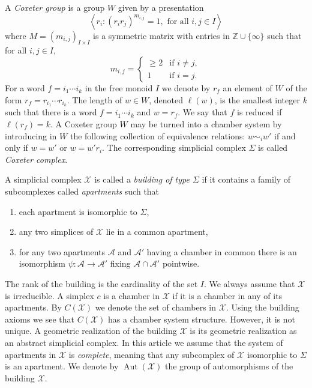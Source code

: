 \documentclass[11pt]{amsart}
\newcommand{\ZZ}{\mathbb{Z}}
\newcommand{\scrX}{\mathscr{X}}
\newcommand{\scrA}{\mathscr{A}}
\newcommand{\Aut}{\operatorname{Aut}}
\theoremstyle{plain}
\theoremstyle{definition}
\numberwithin{equation}{section}
\begin{document}
A \emph{Coxeter group} is a group $W$ given by a presentation
\[
	\left\langle
	r_i : (r_i r_j)^{m_{i, j}} = 1, \text{ for all } i, j \in I
	\right\rangle
\]
where $M = (m_{i,j})_{I \times I}$ is a symmetric matrix with entries in $\ZZ \cup \{\infty\}$ such that for all
$i, j \in I$,
\[
	m_{i,j}=
	\begin{cases}
	\geqslant2 & \text{if }i\neq j,\\
	1 & \text{if }i=j.
	\end{cases}
\]
For a word $f=i_1 \cdots i_k$ in the free monoid $I$ we denote by $r_f$ an element of $W$ of the form
$r_f= r_{i_1} \cdots r_{i_k}$. The length of $w \in W$, denoted $\ell(w)$, is the smallest integer $k$ such that there
is a word $f=i_1 \cdots i_k$ and $w=r_f$. We say that $f$ is reduced if $\ell(r_f) = k$. A Coxeter group $W$ may be turned
into a chamber system by introducing in $W$ the following collection of equivalence relations:
$w \sim_i w'$ if and only if $w = w'$ or $w = w' r_i$. The corresponding simplicial complex $\Sigma$ is called 
\emph{Coxeter complex}. 
	
A simplicial complex $\scrX$ is called a \emph{building of type $\Sigma$} if it contains a family of subcomplexes called
\emph{apartments} such that
\begin{enumerate}[start=0, label=(B\roman*), ref=B\roman*]
	\item[(Bi)]\label{en:3:1}
	each apartment is isomorphic to $\Sigma$,
	\item[(Bii)]\label{en:3:2}
	any two simplices of $\scrX$ lie in a common apartment,
	\item[(Biii)]\label{en:3:3}
	for any two apartments $\scrA$ and $\scrA'$ having a chamber in common there is an 
	isomorphism $\psi: \scrA \rightarrow \scrA'$ fixing $\scrA \cap \scrA'$ pointwise.
\end{enumerate}
The rank of the building is the cardinality of the set $I$. We always assume that $\scrX$ is irreducible.
A simplex $c$ is a chamber in $\scrX$ if it is a chamber in any of its apartments. By $C(\scrX)$ we denote the set of chambers 
in $\scrX$. Using the building axioms we see that $C(\scrX)$ has a chamber system structure. However, it is not unique. 
A geometric realization of the building	$\scrX$ is its geometric realization as an abstract simplicial complex. In this article 
we assume that the system of apartments in $\scrX$ is \emph{complete}, meaning that any subcomplex of $\scrX$ isomorphic to 
$\Sigma$ is an apartment. We denote by $\Aut(\scrX)$ the group of automorphisms of the building $\scrX$.
\end{document}
